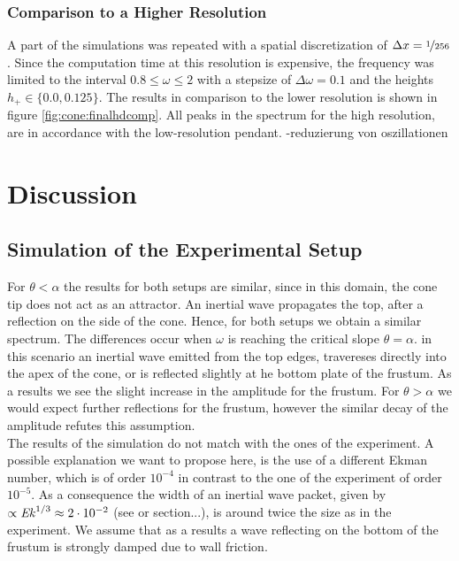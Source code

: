 {\subsubsection{Comparison to a Higher Resolution}

A part of the simulations was repeated with a spatial discretization of $\Delta x= \nicefrac{1}{256}$.
Since the computation time at this resolution is expensive, the frequency was limited
to the interval $0.8\leq\omega\leq2$ with a stepsize of $\Delta \omega = 0.1$ and the heights
$h_+\in\{0.0, 0.125\}$.
The results in comparison to the lower resolution is shown in figure \ref{fig:cone:finalhdcomp}.
All peaks in the spectrum for the high resolution, are in accordance with the low-resolution pendant.
-reduzierung von oszillationen

\clearpage

\section{Discussion}
\subsection{Simulation of the Experimental Setup}

For $\theta < \alpha$ the results for both setups are similar, since in this domain, the cone tip does not act as an attractor.
An inertial wave propagates the top, after a reflection on the side of the cone.
Hence, for both setups we obtain a similar spectrum.
The differences occur when $\omega$ is reaching the critical slope $\theta = \alpha$. in this scenario an inertial wave emitted from the
top edges, travereses directly into the apex of the cone, or is reflected slightly at he bottom plate of the frustum.
As a results we see the slight increase in the amplitude for the frustum.
For $\theta > \alpha$ we would expect further reflections for the frustum, however the similar
decay of the amplitude refutes this assumption.\\
The results of the simulation do not match with the ones of the experiment.
A possible explanation we want to propose here, is the use of a different Ekman number, which is of order $10^{-4}$ in contrast
to the one of the experiment of order $10^{-5}$.
As a consequence the width of an inertial wave packet, given by $\propto \mbox{\textit{Ek}}^{1/3} \approx 2\cdot10^{-2}$ (see \citep{} or section...),
is around twice the size as in the experiment. We assume that as a results a wave reflecting on the bottom of the frustum
is strongly damped due to wall friction.

}
